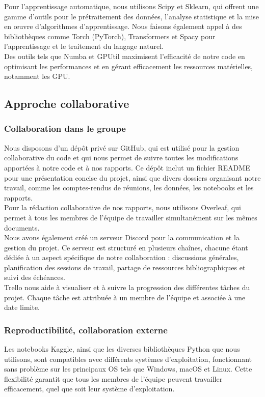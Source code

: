 \documentclass{article}
\begin{document}
Pour l'apprentissage automatique, nous utilisons Scipy et Sklearn, qui offrent une gamme d'outils pour le prétraitement des données, l'analyse statistique et la mise en œuvre d'algorithmes d'apprentissage. Nous faisons également appel à des bibliothèques comme Torch (PyTorch), Transformers et Spacy pour l'apprentissage et le traitement du langage naturel. \\

Des outils tels que Numba et GPUtil maximisent l'efficacité de notre code en optimisant les performances et en gérant efficacement les ressources matérielles, notamment les GPU.

\subsection{Approche collaborative}
\subsubsection{Collaboration dans le groupe}
Nous disposons d'un dépôt privé sur GitHub, qui est utilisé pour la gestion collaborative du code et qui nous permet de suivre toutes les modifications apportées à notre code et à nos rapports. Ce dépôt inclut un fichier README pour une présentation concise du projet, ainsi que divers dossiers organisant notre travail, comme les comptes-rendus de réunions, les données, les notebooks et les rapports. \\

Pour la rédaction collaborative de nos rapports, nous utilisons Overleaf, qui permet à tous les membres de l'équipe de travailler simultanément sur les mêmes documents. \\

Nous avons également créé un serveur Discord pour la communication et la gestion du projet. Ce serveur est structuré en plusieurs chaînes, chacune étant dédiée à un aspect spécifique de notre collaboration : discussions générales, planification des sessions de travail, partage de ressources bibliographiques et suivi des échéances. \\

Trello nous aide à visualiser et à suivre la progression des différentes tâches du projet. Chaque tâche est attribuée à un membre de l'équipe et associée à une date limite.

\subsubsection{Reproductibilité, collaboration externe}
Les notebooks Kaggle, ainsi que les diverses bibliothèques Python que nous utilisons, sont compatibles avec différents systèmes d'exploitation, fonctionnant sans problème sur les principaux OS tels que Windows, macOS et Linux. Cette flexibilité garantit que tous les membres de l'équipe peuvent travailler efficacement, quel que soit leur système d'exploitation. \\
\end{document}
